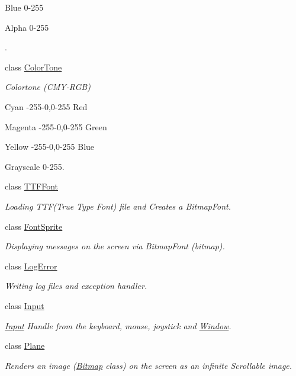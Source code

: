 \begin{DoxyCompactItemize}
\begin{DoxyCompactList}
 Blue 0-\/255 \par
 Alpha 0-\/255 \par
. \item\end{DoxyCompactList}\item 
class \hyperlink{class_f2_c_1_1_color_tone}{ColorTone}
\begin{DoxyCompactList}\small\item\em Colortone (CMY-\/RGB) \par
 Cyan -\/255-\/0,0-\/255 Red \par
 Magenta -\/255-\/0,0-\/255 Green \par
 Yellow -\/255-\/0,0-\/255 Blue \par
 Grayscale 0-\/255. \item\end{DoxyCompactList}\item 
class \hyperlink{class_f2_c_1_1_t_t_f_font}{TTFFont}
\begin{DoxyCompactList}\small\item\em Loading TTF(True Type Font) file and Creates a BitmapFont. \item\end{DoxyCompactList}\item 
class \hyperlink{class_f2_c_1_1_font_sprite}{FontSprite}
\begin{DoxyCompactList}\small\item\em Displaying messages on the screen via BitmapFont (bitmap). \item\end{DoxyCompactList}\item 
class \hyperlink{class_f2_c_1_1_log_error}{LogError}
\begin{DoxyCompactList}\small\item\em Writing log files and exception handler. \item\end{DoxyCompactList}\item 
class \hyperlink{class_f2_c_1_1_input}{Input}
\begin{DoxyCompactList}\small\item\em \hyperlink{class_f2_c_1_1_input}{Input} Handle from the keyboard, mouse, joystick and \hyperlink{class_f2_c_1_1_window}{Window}. \item\end{DoxyCompactList}\item 
class \hyperlink{class_f2_c_1_1_plane}{Plane}
\begin{DoxyCompactList}\small\item\em Renders an image (\hyperlink{class_f2_c_1_1_bitmap}{Bitmap} class) on the screen as an infinite Scrollable image. \item\end{DoxyCompactList}\item 

\end{DoxyCompactItemize}
